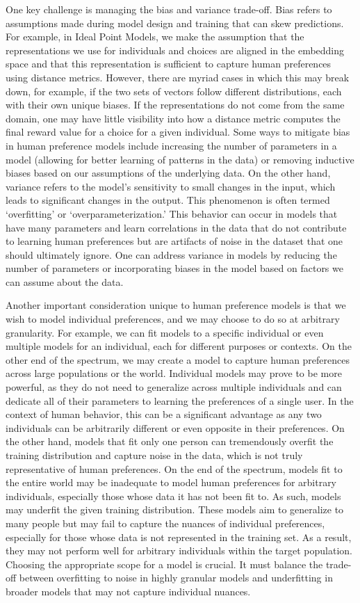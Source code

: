 \documentclass[
  letterpaper,
  numbers=noenddot,
  DIV=11]{scrreprt}
\theoremstyle{definition}
\theoremstyle{plain}
\theoremstyle{plain}
\theoremstyle{remark}
\begin{document}
One key challenge is managing the bias and variance trade-off. Bias
refers to assumptions made during model design and training that can
skew predictions. For example, in Ideal Point Models, we make the
assumption that the representations we use for individuals and choices
are aligned in the embedding space and that this representation is
sufficient to capture human preferences using distance metrics. However,
there are myriad cases in which this may break down, for example, if the
two sets of vectors follow different distributions, each with their own
unique biases. If the representations do not come from the same domain,
one may have little visibility into how a distance metric computes the
final reward value for a choice for a given individual. Some ways to
mitigate bias in human preference models include increasing the number
of parameters in a model (allowing for better learning of patterns in
the data) or removing inductive biases based on our assumptions of the
underlying data. On the other hand, variance refers to the model's
sensitivity to small changes in the input, which leads to significant
changes in the output. This phenomenon is often termed `overfitting' or
`overparameterization.' This behavior can occur in models that have many
parameters and learn correlations in the data that do not contribute to
learning human preferences but are artifacts of noise in the dataset
that one should ultimately ignore. One can address variance in models by
reducing the number of parameters or incorporating biases in the model
based on factors we can assume about the data.

Another important consideration unique to human preference models is
that we wish to model individual preferences, and we may choose to do so
at arbitrary granularity. For example, we can fit models to a specific
individual or even multiple models for an individual, each for different
purposes or contexts. On the other end of the spectrum, we may create a
model to capture human preferences across large populations or the
world. Individual models may prove to be more powerful, as they do not
need to generalize across multiple individuals and can dedicate all of
their parameters to learning the preferences of a single user. In the
context of human behavior, this can be a significant advantage as any
two individuals can be arbitrarily different or even opposite in their
preferences. On the other hand, models that fit only one person can
tremendously overfit the training distribution and capture noise in the
data, which is not truly representative of human preferences. On the end
of the spectrum, models fit to the entire world may be inadequate to
model human preferences for arbitrary individuals, especially those
whose data it has not been fit to. As such, models may underfit the
given training distribution. These models aim to generalize to many
people but may fail to capture the nuances of individual preferences,
especially for those whose data is not represented in the training set.
As a result, they may not perform well for arbitrary individuals within
the target population. Choosing the appropriate scope for a model is
crucial. It must balance the trade-off between overfitting to noise in
highly granular models and underfitting in broader models that may not
capture individual nuances.
\end{document}
